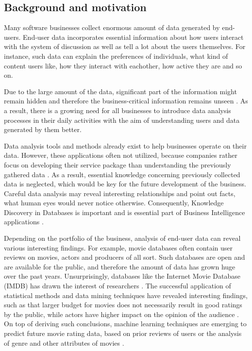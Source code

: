 \subsection{Background and motivation}
	Many software businesses collect enormous amount of data generated by end-users. End-user data incorporates essential information about how users interact with the system of discussion as well as tell a lot about the users themselves. For instance, such data can explain the preferences of individuals, what kind of content users like, how they interact with eachother, how active they are and so on.
    
    Due to the large amount of the data, significant part of the information might remain hidden and therefore the business-critical information remains unseen \cite{inmon2007tapping, wegener2010integrating, introtodatamining}. As a result, there is a growing need for all businesses to introduce data analysis processes in their daily activities with the aim of understanding users and data generated by them better.
	
	Data analysis tools and methods already exist to help businesses operate on their data. However, these applications often not utilized, because companies rather focus on developing their service package than understanding the previously gathered data \cite{inmon2007tapping}. As a result, essential knowledge concerning previously collected data is neglected, which would be key for the future development of the business. Careful data analysis may reveal interesting relationships and point out facts, what human eyes would never notice otherwise. Consequently, Knowledge Discovery in Databases is important and is essential part of Business Intelligence applications \cite{zarsky2002mine}. 

    Depending on the portfolio of the business, analysis of end-user data can reveal various interesting findings. For example, movie databases often contain user reviews on movies, actors and producers of all sort. Such databases are open and are available for the public, and therefore the amount of data has grown huge over the past years. Unsurprisingly, databases like the Internet Movie Database (IMDB) has drawn the interest of researchers \cite{saraee2004data, kabinsingha2012movie, sumathi2013performance}. The successful application of statistical methods and data mining techniques have revealed interesting findings, such as that larger budget for movies does not necessarily result in good ratings by the public, while actors have higher impact on the opinion of the audience \cite{saraee2004data}. On top of deriving such conclusions, machine learning techniques are emerging to predict future movie rating data, based on prior reviews of users \cite{saraee2004data} or the analysis of genre and other attributes of movies \cite{kabinsingha2012movie}.

